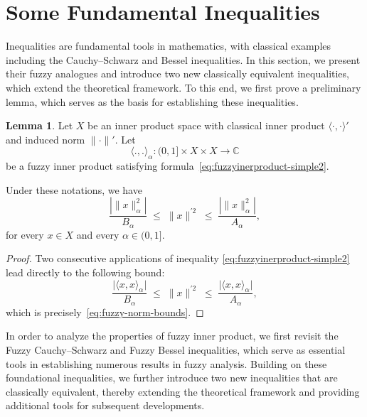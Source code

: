\documentclass[preprint,12pt]{elsarticle}
\theoremstyle{definition}
\newtheorem{lemma}{Lemma}[section]
\begin{document}
\section{Some Fundamental Inequalities}
Inequalities are fundamental tools in mathematics, with classical examples including the Cauchy--Schwarz and Bessel inequalities. In this section, we present their fuzzy analogues and introduce two new classically equivalent inequalities, which extend the theoretical framework. To this end, we first prove a preliminary lemma, which serves as the basis for establishing these inequalities.

\begin{lemma}\label{lemma:fuzzy-norm-bounds}
		Let $X$ be an inner product space with classical inner product 
	\(\langle\cdot,\cdot\rangle'\) 
	and induced norm 
	\(\|\cdot\|'\).
	Let 
	\[
	\langle  ., . \rangle_\alpha : (0,1] \times X \times X \to \mathbb{C}
	\]
	be a fuzzy inner product satisfying formula~\eqref{eq:fuzzyinerproduct-simple2}.  

	Under these notations, we have
	\begin{equation}\label{eq:fuzzy-norm-bounds}
		\frac{|\|x\|_{\alpha}^{2}|}{B_{\alpha}}
		\;\leq\;
		\|x\|^{\prime 2}
		\;\leq\;
		\frac{|\|x\|_{\alpha}^{2}|}{A_{\alpha}} ,
	\end{equation}
	for every \(x\in X\) and every \(\alpha\in(0,1]\).
\end{lemma}

\begin{proof}
	Two consecutive applications of inequality  \eqref{eq:fuzzyinerproduct-simple2} lead directly to the following bound:
	\[
	\frac{\big|\langle  x, x \rangle_\alpha\big|}{B_{\alpha}}
	\;\leq\;
	\|x\|^{\prime 2}
	\;\leq\;
	\frac{\big|\langle  x, x \rangle_\alpha\big|}{A_{\alpha}} ,
	\]
	which is precisely~\eqref{eq:fuzzy-norm-bounds}.
\end{proof}
In order to analyze the properties of fuzzy inner  product, we first revisit the Fuzzy Cauchy–Schwarz and Fuzzy Bessel inequalities, which serve as essential tools in establishing numerous results in fuzzy analysis. Building on these foundational inequalities, we further introduce two new inequalities that are classically equivalent, thereby extending the theoretical framework and providing additional tools for subsequent developments.
\end{document}
